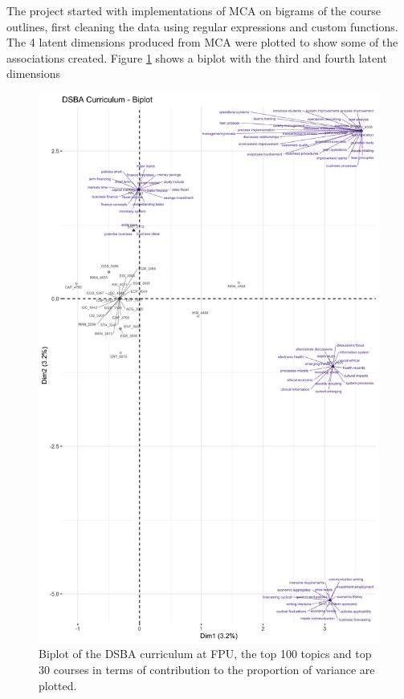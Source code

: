 The project started with implementations of MCA on bigrams of the course outlines,  first cleaning the data using regular expressions 
\cite{regex} and custom functions.  The 4 latent dimensions produced from MCA were plotted to show some of the associations created.  Figure \ref{fig:mca_2} 
shows a biplot with the third and fourth latent dimensions


\begin{figure}[H]
\centering

\includegraphics[width = 1\textwidth, height = .9\textheight]{Content/images/mca_bp_3.png}
\caption{Biplot of the DSBA curriculum at FPU,  the top 100 topics and top 30 courses in terms of contribution to the proportion of variance are plotted.}
\label{fig:mca_2}
\end{figure}

